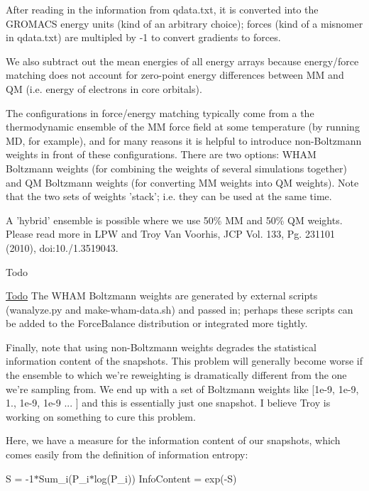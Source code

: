 \-After reading in the information from qdata.\-txt, it is converted into the \-G\-R\-O\-M\-A\-C\-S energy units (kind of an arbitrary choice); forces (kind of a misnomer in qdata.\-txt) are multipled by -\/1 to convert gradients to forces.

\-We also subtract out the mean energies of all energy arrays because energy/force matching does not account for zero-\/point energy differences between \-M\-M and \-Q\-M (i.\-e. energy of electrons in core orbitals).

\-The configurations in force/energy matching typically come from a the thermodynamic ensemble of the \-M\-M force field at some temperature (by running \-M\-D, for example), and for many reasons it is helpful to introduce non-\/\-Boltzmann weights in front of these configurations. \-There are two options\-: \-W\-H\-A\-M \-Boltzmann weights (for combining the weights of several simulations together) and \-Q\-M \-Boltzmann weights (for converting \-M\-M weights into \-Q\-M weights). \-Note that the two sets of weights 'stack'; i.\-e. they can be used at the same time.

\-A 'hybrid' ensemble is possible where we use 50\% \-M\-M and 50\% \-Q\-M weights. \-Please read more in \-L\-P\-W and \-Troy \-Van \-Voorhis, \-J\-C\-P \-Vol. 133, \-Pg. 231101 (2010), doi\-:10./1.3519043.

\begin{DoxyRefDesc}{\-Todo}
\item[\hyperlink{todo__todo000004}{\-Todo}]\-The \-W\-H\-A\-M \-Boltzmann weights are generated by external scripts (wanalyze.\-py and make-\/wham-\/data.\-sh) and passed in; perhaps these scripts can be added to the \-Force\-Balance distribution or integrated more tightly.\end{DoxyRefDesc}


\-Finally, note that using non-\/\-Boltzmann weights degrades the statistical information content of the snapshots. \-This problem will generally become worse if the ensemble to which we're reweighting is dramatically different from the one we're sampling from. \-We end up with a set of \-Boltzmann weights like \mbox{[}1e-\/9, 1e-\/9, 1., 1e-\/9, 1e-\/9 ... \mbox{]} and this is essentially just one snapshot. \-I believe \-Troy is working on something to cure this problem.

\-Here, we have a measure for the information content of our snapshots, which comes easily from the definition of information entropy\-:

\-S = -\/1$\ast$\-Sum\-\_\-i(\-P\-\_\-i$\ast$log(\-P\-\_\-i)) \-Info\-Content = exp(-\/\-S)

